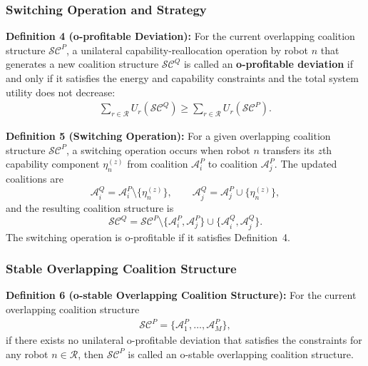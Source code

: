 \documentclass[journal,twoside,web]{ieeecolor}
\begin{document}
\subsubsection{Switching Operation and Strategy}

\textbf{Definition 4 (o-profitable Deviation):}
For the current overlapping coalition structure $\mathcal{SC}^P$, a unilateral capability-reallocation operation by robot $n$ that generates a new coalition structure $\mathcal{SC}^Q$ is called an \textbf{o-profitable deviation} if and only if it satisfies the energy and capability constraints and the total system utility does not decrease:
\begin{align}
\sum_{r \in \mathcal{R}} U_r(\mathcal{SC}^Q) \geq \sum_{r \in \mathcal{R}} U_r(\mathcal{SC}^P).
\label{eq:o_profitable}
\end{align}

\textbf{Definition 5 (Switching Operation):}
For a given overlapping coalition structure $\mathcal{SC}^P$, a switching operation occurs when robot $n$ transfers its $z$th capability component $\eta_n^{(z)}$ from coalition $\mathcal{A}_i^P$ to coalition $\mathcal{A}_j^P$. The updated coalitions are
\begin{equation}
\mathcal{A}_i^Q=\mathcal{A}_i^P\setminus\{\eta_n^{(z)}\},\qquad
\mathcal{A}_j^Q=\mathcal{A}_j^P\cup\{\eta_n^{(z)}\},
\end{equation}
and the resulting coalition structure is
\begin{equation}
\mathcal{SC}^Q=\mathcal{SC}^P\setminus\{\mathcal{A}_i^P,\mathcal{A}_j^P\}\cup\{\mathcal{A}_i^Q,\mathcal{A}_j^Q\}.
\label{eq:switch_structure}
\end{equation}
The switching operation is o-profitable if it satisfies Definition~4.

\subsubsection{Stable Overlapping Coalition Structure}

\textbf{Definition 6 (o-stable Overlapping Coalition Structure):}
For the current overlapping coalition structure
\begin{align}
\mathcal{SC}^P=\{\mathcal{A}_1^P,\dots,\mathcal{A}_M^P\},
\end{align}
if there exists no unilateral o-profitable deviation that satisfies the constraints for any robot $n\in\mathcal{R}$, then $\mathcal{SC}^P$ is called an o-stable overlapping coalition structure.
\end{document}
